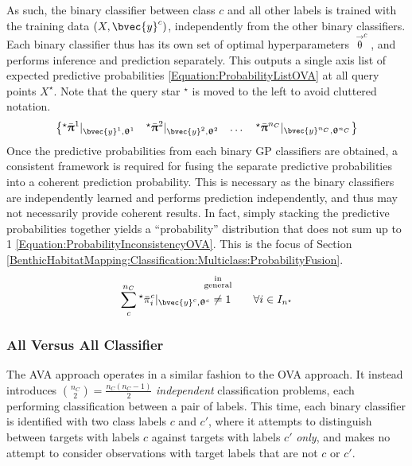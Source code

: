 				As such, the binary classifier between class $c$ and all other labels is trained with the training data $(X, \bvec{y}^{c})$, independently from the other binary classifiers. Each binary classifier thus has its own set of optimal hyperparameters $\vec{\uptheta}^{c}$, and performs inference and prediction separately. This outputs a single axis list of expected predictive probabilities \eqref{Equation:ProbabilityListOVA} at all query points $X^{\star}$. Note that the query star $^{\star}$ is moved to the left to avoid cluttered notation. \begin{equation}
					\begin{Bmatrix*}
						{^{\star}}\bar{\vec{\uppi}}^{1} |_{\bvec{y}^{1}, \vec{\uptheta}^{1}} & {^{\star}}\bar{\vec{\uppi}}^{2} |_{\bvec{y}^{2}, \vec{\uptheta}^{2}} & \dots & {^{\star}}\bar{\vec{\uppi}}^{n_{C}} |_{\bvec{y}^{n_{C}}, \vec{\uptheta}^{n_{C}}}
					\end{Bmatrix*} 
				\label{Equation:ProbabilityListOVA}
				\end{equation} Once the predictive probabilities from each binary GP classifiers are obtained, a consistent framework is required for fusing the separate predictive probabilities into a coherent prediction probability. This is necessary as the binary classifiers are independently learned and performs prediction independently, and thus may not necessarily provide coherent results. In fact, simply stacking the predictive probabilities together yields a ``probability'' distribution that does not sum up to 1 \eqref{Equation:ProbabilityInconsistencyOVA}. This is the focus of Section \ref{BenthicHabitatMapping:Classification:Multiclass:ProbabilityFusion}. \begin{equation}
					\sum_{c}^{n_{C}} {^{\star}}\bar{\pi}^{c}_{i} |_{\bvec{y}^{c}, \vec{\uptheta}^{c}} \stackrel{\mathclap{\substack{\text{in} \\ \text{general} \\ \quad }}}{\neq} 1 \qquad \forall i \in I_{n^{\star}}
				\label{Equation:ProbabilityInconsistencyOVA}
				\end{equation}
				
			\subsubsection{All Versus All Classifier}
			\label{BenthicHabitatMapping:Classification:MulticlassClassification:AVA}
			
				The AVA approach operates in a similar fashion to the OVA approach. It instead introduces ${n_{C} \choose 2} = \frac{n_{C} (n_{C} - 1)}{2}$ \textit{independent} classification problems, each performing classification between a pair of labels. This time, each binary classifier is identified with two class labels $c$ and $c'$, where it attempts to distinguish between targets with labels $c$ against targets with labels $c'$ \textit{only}, and makes no attempt to consider observations with target labels that are not $c$ or $c'$. 
				
